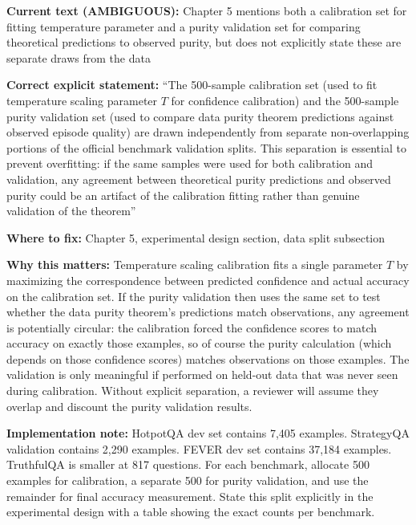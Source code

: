 \documentclass[11pt,a4paper]{article}
\newcommand{\criticalbox}[2]{%
\begin{tcolorbox}[enhanced,breakable,
  colback=LightCrimson,colframe=Crimson,boxrule=1.5pt,arc=4pt,
  left=8pt,right=8pt,top=6pt,bottom=6pt,
  title={\bfseries\small\color{white}#1},
  attach boxed title to top left={yshift=-2mm,xshift=6mm},
  boxed title style={colback=Crimson,arc=3pt,boxrule=0pt,
    left=4pt,right=4pt,top=2pt,bottom=2pt}]
#2
\end{tcolorbox}}
\begin{document}
\criticalbox{CORRECTION 5: Calibration and Purity Validation Sets Must Be Separate}{
\textbf{Current text (AMBIGUOUS):} Chapter 5 mentions both a calibration set for fitting temperature parameter and a purity validation set for comparing theoretical predictions to observed purity, but does not explicitly state these are separate draws from the data

\textbf{Correct explicit statement:} ``The 500-sample calibration set (used to fit temperature scaling parameter $T$ for confidence calibration) and the 500-sample purity validation set (used to compare data purity theorem predictions against observed episode quality) are drawn independently from separate non-overlapping portions of the official benchmark validation splits. This separation is essential to prevent overfitting: if the same samples were used for both calibration and validation, any agreement between theoretical purity predictions and observed purity could be an artifact of the calibration fitting rather than genuine validation of the theorem''

\textbf{Where to fix:} Chapter 5, experimental design section, data split subsection

\textbf{Why this matters:} Temperature scaling calibration fits a single parameter $T$ by maximizing the correspondence between predicted confidence and actual accuracy on the calibration set. If the purity validation then uses the same set to test whether the data purity theorem's predictions match observations, any agreement is potentially circular: the calibration forced the confidence scores to match accuracy on exactly those examples, so of course the purity calculation (which depends on those confidence scores) matches observations on those examples. The validation is only meaningful if performed on held-out data that was never seen during calibration. Without explicit separation, a reviewer will assume they overlap and discount the purity validation results.

\textbf{Implementation note:} HotpotQA dev set contains 7,405 examples. StrategyQA validation contains 2,290 examples. FEVER dev set contains 37,184 examples. TruthfulQA is smaller at 817 questions. For each benchmark, allocate 500 examples for calibration, a separate 500 for purity validation, and use the remainder for final accuracy measurement. State this split explicitly in the experimental design with a table showing the exact counts per benchmark.
}
\end{document}
